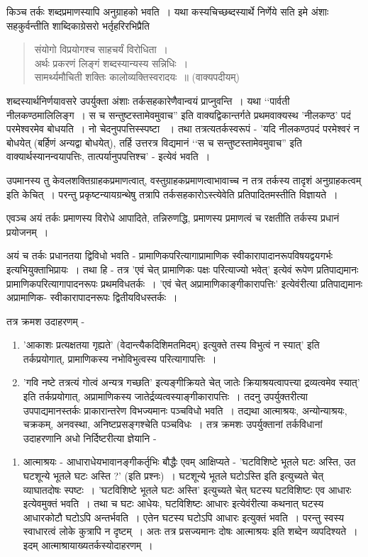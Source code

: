 {किञ्च तर्कः शब्दप्रमाणस्यापि अनुग्राहको भवति~। यथा कस्यचिच्छब्दस्यार्थे निर्णेये सति इमे अंशाः सहकुर्वन्तीति शाब्दिकाग्रेसरो भर्तृहरिरभिप्रैति 
\begin{verse}
संयोगो विप्रयोगश्च साहचर्यं विरोधिता~। \\
अर्थः प्रकरणं लिङ्गं शब्दस्यान्यस्य सन्निधिः~। \\
सामर्थ्यमौचिती शक्तिः कालोव्यक्तिस्वरादयः~॥ (वाक्यपदीयम्)
\end{verse}
शब्दस्यार्थनिर्णयावसरे उपर्युक्ता अंशाः तर्कसहकारेणैवान्वयं प्राप्नुवन्ति~। यथा ‘‘पार्वती नीलकण्ठमालिलिङ्ग~। स च सन्तुष्टस्तामेवमुवाच'' इति वाक्यद्विकान्तर्गते प्रथमवाक्यस्थ 'नीलकण्ठ' पदं परमेश्वरमेव बोधयति~। नो चेदनुपपत्तिस्स्पष्टा ~। तथा तत्रत्यतर्कस्वरूपं - 'यदि नीलकण्ठपदं परमेश्वरं न बोधयेत् (बर्हिणं अन्यद्वा बोधयेत्), तर्हि उत्तरत्र विद्यमानं ‘‘स च सन्तुष्टस्तामेवमुवाच'' इति वाक्यार्थस्यानन्वयापत्तिः, तात्पर्यानुपपत्तिश्च' - इत्येवं भवति~। 

उपमानस्य तु केवलशक्तिग्राहकप्रमाणत्वात्, वस्तुग्राहकप्रमाणत्वाभावाच्च न तत्र तर्कस्य तादृशं अनुग्राहकत्वम् इति केचित्~। परन्तु प्रकृष्टन्यायग्रन्थेषु तत्रापि तर्कसहकारोऽस्त्येवेति प्रतिपादितमस्तीति विज्ञायते~। 

एवञ्च अयं तर्कः प्रमाणस्य विरोधे आपादिते, तन्निरुणद्धि, प्रमाणस्य प्रमाणत्वं च रक्षतीति तर्कस्य प्रधानं प्रयोजनम्~। 

अयं च तर्कः प्रधानतया द्विविधो भवति - प्रामाणिकपरित्यागाप्रामाणिक स्वीकारा\-पादानरूपविषयद्वयगर्भः इत्यभियुक्ताभिप्रायः~। तथा हि - तत्र 'एवं चेत् प्रामाणिकः पक्षः परित्याज्यो भवेत्' इत्येवं रूपेण प्रतिपाद्यमानः प्रामाणिकपरित्यागापादनरूपः प्रथमविधतर्कः~। 'एवं चेत् अप्रामाणिकाङ्गीकारापत्तिः' इत्येवंरीत्या प्रतिपाद्यमानः अप्रामाणिक- स्वीकारापादनरूपः द्वितीयविधस्तर्कः~। 

तत्र क्रमश उदाहरणम् - 
\begin{enumerate}
\item	'आकाशः प्रत्यक्षतया गृह्यते' (वेदान्त्यैकदिशिमतमिदम्) इत्युक्ते तस्य विभुत्वं न  स्यात्' इति तर्कप्रयोगात्, प्रामाणिकस्य नभोविभुत्वस्य परित्यागापत्तिः~। 
\item	'गवि नष्टे तत्रत्यं गोत्वं अन्यत्र गच्छति' इत्यङ्गीक्रियते चेत् जातेः क्रियाश्रयत्वा\-पत्त्या  द्रव्यत्वमेव स्यात्' इति तर्कप्रयोगात्, अप्रामाणिकस्य जातेर्द्रव्यत्वस्याङ्गीकारा\-पत्तिः~। तदनु उपर्युक्तरीत्या उपपाद्यमानस्तर्कः प्राकारान्तरेण विभज्यमानः पञ्चविधो भवति~। तद्यथा आत्माश्रयः, अन्योन्याश्रयः, चक्रकम्, अनवस्था, अनिष्टप्रसङ्गश्चेति पञ्चविधः~। तत्र क्रमशः उपर्युक्तानां तर्कविधानां उदाहरणानि अधो निर्दिष्टरीत्या ज्ञेयानि - 
\end{enumerate}
\begin{enumerate}
\item आत्माश्रयः - आधाराधेयभावानङ्गीकर्तृभिः बौद्धैः एवम् आक्षिप्यते - 'घटविशिष्टे भूतले घटः अस्ति, उत घटशून्ये भूतले घटः अस्ति ?' (इति प्रश्नः)~। घटशून्ये भूतले घटोऽस्ति इति इत्युच्यते चेत् व्याघातदोषः स्पष्टः~। 'घटविशिष्टे भूतले घटः अस्ति' इत्युच्यते चेत् घटस्य घटविशिष्टः एव आधारः इत्येवमुक्तं भवति~। तथा च घटः आधेयः, घटविशिष्टः आधारः इत्येवंरीत्या कथनात् घटस्य आधारकोटौ घटोऽपि अन्तर्भवति~। एतेन घटस्य घटोऽपि आधारः इत्युक्तं भवति~। परन्तु स्वस्य स्वाधारत्वं लोके कुत्रापि न दृष्टम्~। अतः तत्र प्रसज्यमानः दोषः आत्माश्रयः इति शब्देन व्यपदिश्यते~। इदम् आत्माश्रायाख्यतर्कस्योदाहरणम्~। 


\end{enumerate}}
